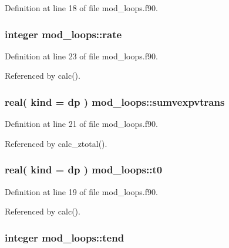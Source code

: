 Definition at line 18 of file mod\+\_\+loops.\+f90.

\subsubsection[{\texorpdfstring{rate}{rate}}]{\setlength{\rightskip}{0pt plus 5cm}integer mod\+\_\+loops\+::rate}\hypertarget{namespacemod__loops_ab4cd7025ac3ba99baaa6d706f7c7cdb7}{}\label{namespacemod__loops_ab4cd7025ac3ba99baaa6d706f7c7cdb7}


Definition at line 23 of file mod\+\_\+loops.\+f90.



Referenced by calc().

\subsubsection[{\texorpdfstring{sumvexpvtrans}{sumvexpvtrans}}]{\setlength{\rightskip}{0pt plus 5cm}real( kind = dp ) mod\+\_\+loops\+::sumvexpvtrans}\hypertarget{namespacemod__loops_a7c4cc7b204cbf0459e4519befe2b1ef5}{}\label{namespacemod__loops_a7c4cc7b204cbf0459e4519befe2b1ef5}


Definition at line 21 of file mod\+\_\+loops.\+f90.



Referenced by calc\+\_\+ztotal().

\subsubsection[{\texorpdfstring{t0}{t0}}]{\setlength{\rightskip}{0pt plus 5cm}real( kind = dp ) mod\+\_\+loops\+::t0}\hypertarget{namespacemod__loops_ab6a118712ba0b676790e9cace45c35b5}{}\label{namespacemod__loops_ab6a118712ba0b676790e9cace45c35b5}


Definition at line 19 of file mod\+\_\+loops.\+f90.



Referenced by calc().

\subsubsection[{\texorpdfstring{tend}{tend}}]{\setlength{\rightskip}{0pt plus 5cm}integer mod\+\_\+loops\+::tend}\hypertarget{namespacemod__loops_a67ea99979384ac6268ae84f7bd2773ec}{}\label{namespacemod__loops_a67ea99979384ac6268ae84f7bd2773ec}


